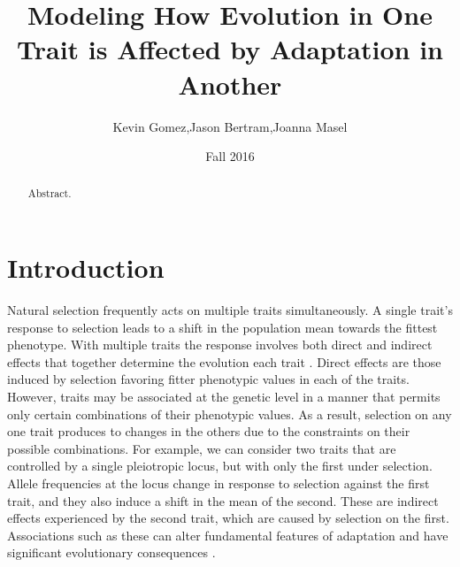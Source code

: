 \documentclass[11pt,twocolumn]{article}
\title{Modeling How Evolution in One Trait is Affected by Adaptation in Another}
\date{Fall 2016}
\author{Kevin Gomez,Jason Bertram,Joanna Masel}
\begin{document}
\maketitle
\newpage

\begin{abstract}
Abstract.
\end{abstract}

\section*{Introduction}
\label{sec:introduction}

Natural selection frequently acts on multiple traits simultaneously. A single trait's response to selection leads to a shift in the population mean towards the fittest phenotype. With multiple traits the response involves both direct and indirect effects that together determine the evolution each trait \citep{lande1983measurement,Lovell2013,Wagner2011}. Direct effects are those induced by selection favoring fitter phenotypic values in each of the traits.  However, traits may be associated at the genetic level in a manner that permits only certain combinations of their phenotypic values.  As a result, selection on any one trait produces to changes in the others due to the constraints on their possible combinations. For example, we can consider two traits that are controlled by a single pleiotropic locus, but with only the first under selection. Allele frequencies at the locus change in response to selection against the first trait, and they also induce a shift in the mean of the second. These are indirect effects experienced by the second trait, which are caused by selection on the first.  Associations such as these can alter fundamental features of adaptation and have significant evolutionary consequences \citep{Felsenstein1979, Arnold2001, Arnold2008}.\par
% 
% 
% 
% 
% 
\end{document}
